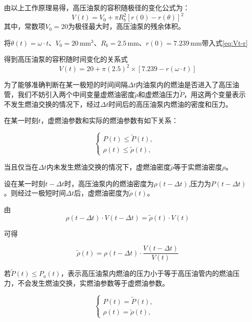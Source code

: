 \documentclass[withoutpreface,bwprint]{cumcmthesis} %
\begin{document}
由以上工作原理易得，高压油泵的容积随极径的变化公式为：
 \begin{equation} \label{eq:Vt-r}
 V(t)=V_0+\pi R^2_b[r(0)-r(\theta)]^2
 \end{equation}
其中，常数项$V_0=20$为极径最大时，高压油泵的残余体积。

将$\theta(t)=\omega \cdot t$、$V_0=20\,\text{mm}^3$、$R_b=2.5\,\text{mm} $、$r(0)=7.239\,\text{mm}$带入式\cref{eq:Vt-r}

得到高压油泵的容积随时间变化的关系式
\begin{equation}
V(t)=20+\pi (2.5)^2\times [7.239-r(\omega \cdot t)]
\end{equation}

为了能够准确判断在某一极短的时间间隔$\Delta t$内油泵内的燃油是否进入了高压油管，我们不妨引入两个中间变量虚燃油密度$\widetilde{\rho}$和虚燃油压力$\widetilde{P}$，用这两个变量表示不发生燃油交换的情况下，经过$\Delta t$时间后的高压油泵内燃油的密度和压力。

在某一时刻$t$，虚燃油参数和实际的燃油参数有如下关系：

\begin{equation}
\left\{
\begin{array}{lr}
P(t)\le \widetilde{P}(t), &  \\
\rho(t)\le \widetilde {\rho}(t), &  
\end{array}
\right.
\end{equation}

当且仅当在$\Delta t$内未发生燃油交换的情况下，虚燃油密度$\widetilde{\rho}$等于实燃油密度$\rho$。

设在某一时刻$t-\Delta t$时，高压油泵内的燃油密度为$\rho(t-\Delta t)$,压力为$P(t-\Delta t)$。则经过一极短时间$\Delta t$后，虚燃油密度为$\widetilde{\rho}(t)$。

由
\begin{equation}
\rho(t-\Delta t) \cdot V(t-\Delta t)=\widetilde{\rho}(t) \cdot V(t)
\end{equation}

可得

\begin{equation}
\widetilde{\rho}(t)=\rho(t-\Delta t) \cdot \frac{V(t-\Delta t)}{V(t)}
\end{equation}

若$\widetilde{P}(t) \le P_a(t)$，表示高压油泵内燃油的压力小于等于高压油管内的燃油压力，不会发生燃油交换，实燃油参数等于虚燃油参数。

\begin{equation}
\left\{
\begin{array}{lr}
P(t)=\widetilde{P}(t), &  \\
\rho(t)=\widetilde{\rho}(t), &  
\end{array}
\right.
\end{equation}
\end{document}
